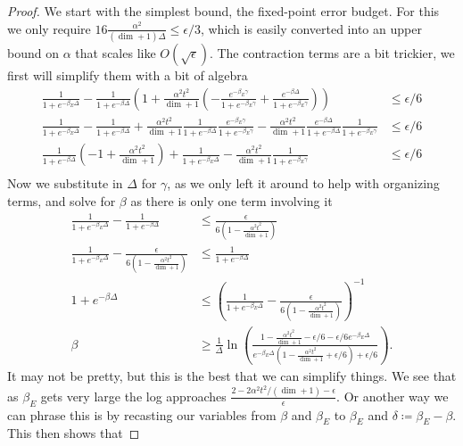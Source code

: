 \documentclass{article}
\newcommand{\bigo}[1]{O\left( #1 \right)}
\begin{document}
\begin{proof}
We start with the simplest bound, the fixed-point error budget. For this we only require $16 \frac{\alpha^2}{(\dim + 1) \Delta} \le \epsilon / 3$, which is easily converted into an upper bound on $\alpha$ that scales like $\bigo{\sqrt{\epsilon}}$. The contraction terms are a bit trickier, we first will simplify them with a bit of algebra
\begin{align}
    \frac{1}{1 + e^{-\beta_E \Delta}} - \frac{1}{1 + e^{-\beta \Delta}} \left(1 + \frac{\alpha^2 t^2}{\dim + 1} \left(-\frac{e^{-\beta_E \gamma}}{1 + e^{-\beta_E \gamma}} + \frac{e^{-\beta \Delta}}{1 + e^{-\beta_E \gamma}} \right) \right) &\le \epsilon /6 \\ 
    \frac{1}{1 + e^{-\beta_E \Delta}} - \frac{1}{1 + e^{-\beta \Delta}} + \frac{\alpha^2 t^2}{\dim + 1} \frac{1}{1 + e^{-\beta \Delta}} \frac{e^{-\beta_E \gamma}}{1 + e^{-\beta_E \gamma}} - \frac{\alpha^2 t^2}{\dim + 1} \frac{e^{-\beta \Delta}}{1 + e^{-\beta \Delta}} \frac{1}{1 + e^{-\beta_E \gamma}} &\le \epsilon / 6 \\
    \frac{1}{1 + e^{-\beta \Delta}}\left(-1 + \frac{\alpha^2 t^2}{\dim + 1} \right) + \frac{1}{1 + e^{-\beta_E \Delta}} - \frac{\alpha^2 t^2}{\dim  +1 } \frac{1}{1+ e^{-\beta_E \gamma}} &\leq \epsilon / 6 \\
\end{align}
    Now we substitute in $\Delta$ for $\gamma$, as we only left it around to help with organizing terms, and solve for $\beta$ as there is only one term involving it
\begin{align}
    \frac{1}{1 + e^{-\beta_E \Delta}} -\frac{1}{1 + e^{-\beta \Delta}} &\leq \frac{\epsilon}{6(1 - \frac{\alpha^2 t^2}{\dim + 1})} \\
    \frac{1}{1 + e^{-\beta_E \Delta}} - \frac{\epsilon}{6(1 - \frac{\alpha^2 t^2}{\dim + 1})} &\leq \frac{1}{1+e^{-\beta \Delta}} \\
    1 + e^{-\beta \Delta } &\leq \left( \frac{1}{1 + e^{-\beta_E \Delta}} - \frac{\epsilon}{6(1 - \frac{\alpha^2 t^2}{\dim + 1})} \right)^{-1} \\
    \beta &\geq \frac{1}{\Delta} \ln \left( \frac{1 - \frac{\alpha^2 t^2}{\dim + 1} - \epsilon/ 6 - \epsilon/6 e^{-\beta_E \Delta}}{e^{-\beta_E \Delta}(1 - \frac{\alpha^2 t^2}{\dim + 1} + \epsilon/6) + \epsilon / 6} \right).
\end{align}
It may not be pretty, but this is the best that we can simplify things. We see that as $\beta_E$ gets very large the log approaches $\frac{2 - 2\alpha^2 t^2 / (\dim + 1) - \epsilon}{\epsilon}$. Or another way we can phrase this is by recasting our variables from $\beta$ and $\beta_E$ to $\beta_E$ and $\delta \coloneqq \beta_E - \beta$. This then shows that 

\end{proof}
\end{document}
